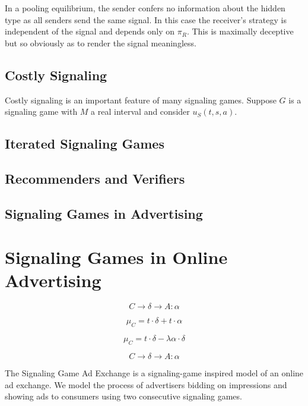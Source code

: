 \documentclass{article}
\begin{document}
In a pooling equilibrium, the sender confers no information about the hidden type as all senders send the same signal. In this case the receiver's strategy is independent of the signal and depends only on $\pi_{ R}$. This is maximally deceptive but so obviously as to render the signal meaningless.

\subsection{Costly Signaling}

Costly signaling is an important feature of many signaling games. Suppose $G$ is a signaling game with $M$ a real interval and consider $u_{S}(t,s,a)$.

\subsection{Iterated Signaling Games}

\subsection{Recommenders and Verifiers}

\subsection{Signaling Games in Advertising}

\newpage

\section{Signaling Games in Online Advertising}

\begin{equation}
	C \longrightarrow \delta \longrightarrow A : \alpha
\end{equation}

\begin{equation}
	\mu_C = t \cdot \delta + t \cdot \alpha
\end{equation}

\begin{equation}
\mu_C = t \cdot \delta - \lambda \alpha \cdot \delta
\end{equation}

\begin{equation}
C \longrightarrow \delta \longrightarrow A : \alpha
\end{equation}

The Signaling Game Ad Exchange is a signaling-game inspired model of an online ad exchange. We model the process of advertisers bidding on impressions and showing ads to consumers using two consecutive signaling games. 
\end{document}
